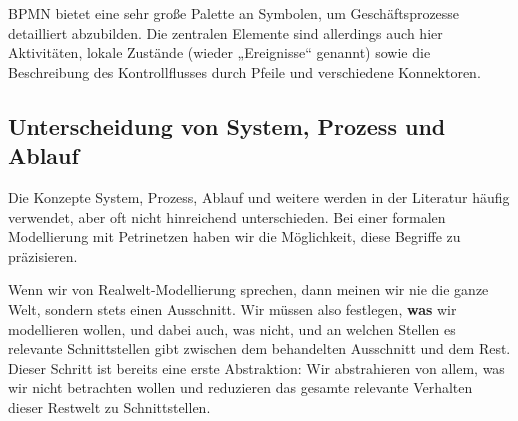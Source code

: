 BPMN bietet eine sehr große Palette an Symbolen, um Geschäftsprozesse detailliert abzubilden. Die zentralen Elemente sind allerdings auch hier Aktivitäten, lokale Zustände (wieder „Ereignisse“ genannt) sowie die Beschreibung des Kontrollflusses durch Pfeile und verschiedene Konnektoren.

\clearpage

\subsection*{Unterscheidung von System, Prozess und Ablauf}

Die Konzepte System, Prozess, Ablauf und weitere werden in der Literatur häufig verwendet, aber oft nicht hinreichend unterschieden. Bei einer formalen Modellierung mit Petrinetzen haben wir die Möglichkeit, diese Begriffe zu präzisieren.

Wenn wir von Realwelt-Modellierung sprechen, dann meinen wir nie die ganze Welt, sondern stets einen Ausschnitt. Wir müssen also festlegen, \textbf{was} wir modellieren wollen, und dabei auch, was nicht, und an welchen Stellen es relevante Schnittstellen gibt zwischen dem behandelten Ausschnitt und dem Rest. Dieser Schritt ist bereits eine erste Abstraktion: Wir abstrahieren von allem, was wir nicht betrachten wollen und reduzieren das gesamte relevante Verhalten dieser Restwelt zu Schnittstellen.


